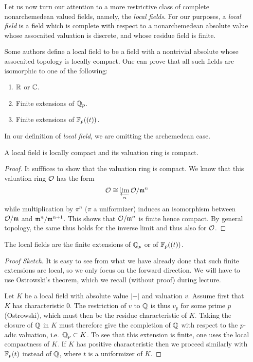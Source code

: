 Let us now turn our attention to a more restrictive class of complete nonarchemedean valued fields, namely, the \emph{local fields}.
For our purposes, a \emph{local field} is a field which is complete with respect to a nonarchemedean absolute value whose assocaited valuation is discrete, and whose residue field is finite.

\begin{remark}
  Some authors define a local field to be a field with a nontrivial absolute whose assocaited topology is locally compact.
  One can prove that all such fields are isomorphic to one of the following:
  \begin{enumerate}
    \item $\mathbb{R}$ or $\mathbb{C}$.
    \item Finite extensions of $\mathbb{Q}_{p}$.
    \item Finite extensions of $\mathbb{F}_{p}((t))$.
  \end{enumerate}
  In our definition of \emph{local field}, we are omitting the archemedean case.
\end{remark}

\begin{proposition}
  A local field is locally compact and its valuation ring is compact.
\end{proposition}
\begin{proof}
  It sufffices to show that the valuation ring is compact.
  We know that this valuation ring $\mathcal{O}$ has the form
  \[ \mathcal{O} \cong \varprojlim_{n} \mathcal{O}/\mathfrak{m}^{n} \]
  while multiplication by $\pi^{n}$ ($\pi$ a uniformizer) induces an isomorphism between $\mathcal{O}/\mathfrak{m}$ and $\mathfrak{m}^{n}/\mathfrak{m}^{n+1}$.
  This shows that $\mathcal{O}/\mathfrak{m}^{n}$ is finite hence compact.
  By general topology, the same thus holds for the inverse limit and thus also for $\mathcal{O}$.
\end{proof}

\begin{theorem}
  The local fields are the finite extensions of $\mathbb{Q}_{p}$ or of $\mathbb{F}_{p}((t))$.
\end{theorem}
\begin{proof}[Proof Sketch]
  It is easy to see from what we have already done that such finite extensions are local, so we only focus on the forward direction.
  We will have to use Ostrowski's theorem, which we recall (without proof) during lecture.

  Let $K$ be a local field with absolute value $|-|$ and valuation $v$.
  Assume first that $K$ has characteristic $0$.
  The restriction of $v$ to $\mathbb{Q}$ is thus $v_{p}$ for some prime $p$ (Ostrowski), which must then be the residue characteristic of $K$.
  Taking the closure of $\mathbb{Q}$ in $K$ must therefore give the completion of $\mathbb{Q}$ with respect to the $p$-adic valuation, i.e.~$\mathbb{Q}_{p} \subset K$.
  To see that this extension is finite, one uses the local compactness of $K$.
  If $K$ has positive characteristic then we proceed similarly with $\mathbb{F}_{p}(t)$ instead of $\mathbb{Q}$, where $t$ is a uniformizer of $K$.
\end{proof}

